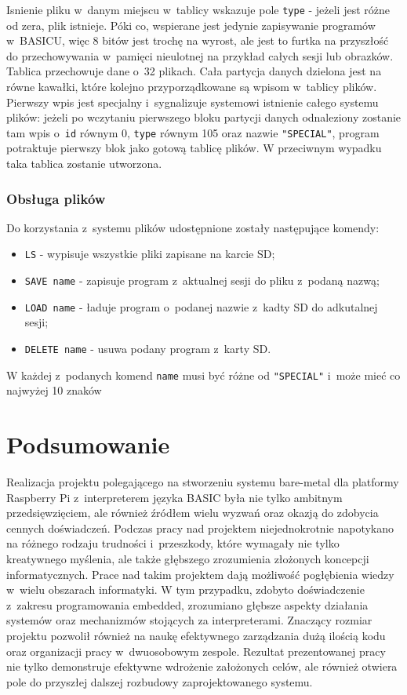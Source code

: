 \documentclass[shortabstract]{iithesis}
\begin{document}
Isnienie pliku w~danym miejscu w~tablicy wskazuje pole \texttt{type} - jeżeli jest różne od zera, plik istnieje. Póki co, wspierane jest jedynie zapisywanie programów w~BASICU, więc 8 bitów jest trochę na wyrost, ale jest to furtka na przyszłość do przechowywania w~pamięci nieulotnej na przykład całych sesji lub obrazków. Tablica przechowuje dane o~32 plikach. Cała partycja danych dzielona jest na równe kawałki, które kolejno przyporządkowane są wpisom w~tablicy plików. Pierwszy wpis jest specjalny i~sygnalizuje systemowi istnienie całego systemu plików: jeżeli po wczytaniu pierwszego bloku partycji danych odnaleziony zostanie tam wpis o~\texttt{id} równym 0, \texttt{type} równym 105 oraz nazwie \texttt{"SPECIAL"}, program potraktuje pierwszy blok jako gotową tablicę plików. W przeciwnym wypadku taka tablica zostanie utworzona.
\subsection{Obsługa plików}
Do korzystania z~systemu plików udostępnione zostały następujące komendy:
\begin{itemize}
 \item \texttt{LS} - wypisuje wszystkie pliki zapisane na karcie SD;
 \item \texttt{SAVE name} - zapisuje program z~aktualnej sesji do pliku z~podaną nazwą;
 \item \texttt{LOAD name} - ładuje program o~podanej nazwie z~kadty SD do adkutalnej sesji;
 \item \texttt{DELETE name} - usuwa podany program z~karty SD.
\end{itemize}
W każdej z~podanych komend \texttt{name} musi być różne od \texttt{"SPECIAL"} i~może mieć co najwyżej 10 znaków

\chapter*{Podsumowanie}
Realizacja projektu polegającego na stworzeniu systemu bare-metal dla platformy Raspberry Pi z~interpreterem języka BASIC była nie tylko ambitnym przedsięwzięciem, ale również źródłem wielu wyzwań oraz okazją do zdobycia cennych doświadczeń. Podczas pracy nad projektem niejednokrotnie napotykano na różnego rodzaju trudności i~przeszkody, które wymagały nie tylko kreatywnego myślenia, ale także głębszego zrozumienia złożonych koncepcji informatycznych.
Prace nad takim projektem dają możliwość pogłębienia wiedzy w~wielu obszarach informatyki. W tym przypadku, zdobyto doświadczenie z~zakresu programowania embedded, zrozumiano głębsze aspekty działania systemów oraz mechanizmów stojących za interpreterami. Znaczący rozmiar projektu pozwolił również na naukę efektywnego zarządzania dużą ilością kodu oraz organizacji pracy w~dwuosobowym zespole.
Rezultat prezentowanej pracy nie tylko demonstruje efektywne wdrożenie założonych celów, ale również otwiera pole do przyszłej dalszej rozbudowy zaprojektowanego systemu. 
\end{document}
